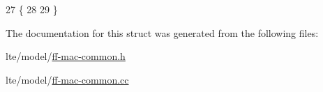 \begin{DoxyCode}
27 \{
28   
29 \}
\end{DoxyCode}


The documentation for this struct was generated from the following files\+:\begin{DoxyCompactItemize}
\item 
lte/model/\hyperlink{ff-mac-common_8h}{ff-\/mac-\/common.\+h}\item 
lte/model/\hyperlink{ff-mac-common_8cc}{ff-\/mac-\/common.\+cc}\end{DoxyCompactItemize}
